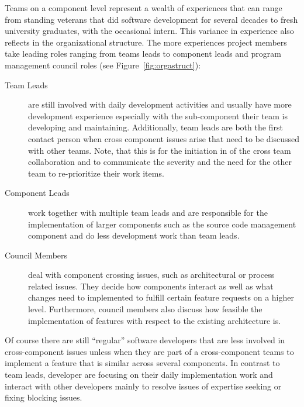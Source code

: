 Teams on a component level represent a wealth of experiences that can range from standing veterans that did software development for several decades to fresh university graduates, with the occasional intern.
This variance in experience also reflects in the organizational structure.
The more experiences project members take leading roles ranging from teams leads to component leads and program management council roles (see Figure~\ref{fig:orgastruct}):
\begin{description}
\item[Team Leads] are still involved with daily development activities and usually have more development experience especially with the sub-component their team is developing and maintaining.
Additionally, team leads are both the first contact person when cross component issues arise that need to be discussed with other teams.
Note, that this is for the initiation in of the cross team collaboration and to communicate the severity and the need for the other team to re-prioritize their work items.
\item[Component Leads] work together with multiple team leads and are responsible for the implementation of larger components such as the source code management component and do less development work than team leads.
\item[Council Members] deal with component crossing issues, such as architectural or process related issues.
They decide how components interact as well as what changes need to implemented to fulfill certain feature requests on a higher level.
Furthermore, council members also discuss how feasible the implementation of features with respect to the existing architecture is.
\end{description}
Of course there are still ``regular'' software developers that are less involved in cross-component issues unless when they are part of a cross-component teams to implement a feature that is similar across several components.
In contrast to team leads, developer are focusing on their daily implementation work and interact with other developers mainly to resolve issues of expertise seeking or fixing blocking issues.

